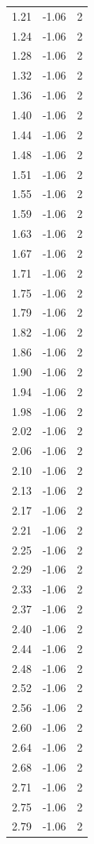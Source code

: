 \begin{longtable}{lrr}
  1.21 & -1.06 & 2 \\
  1.24 & -1.06 & 2 \\
  1.28 & -1.06 & 2 \\
  1.32 & -1.06 & 2 \\
  1.36 & -1.06 & 2 \\
  1.40 & -1.06 & 2 \\
  1.44 & -1.06 & 2 \\
  1.48 & -1.06 & 2 \\
  1.51 & -1.06 & 2 \\
  1.55 & -1.06 & 2 \\
  1.59 & -1.06 & 2 \\
  1.63 & -1.06 & 2 \\
  1.67 & -1.06 & 2 \\
  1.71 & -1.06 & 2 \\
  1.75 & -1.06 & 2 \\
  1.79 & -1.06 & 2 \\
  1.82 & -1.06 & 2 \\
  1.86 & -1.06 & 2 \\
  1.90 & -1.06 & 2 \\
  1.94 & -1.06 & 2 \\
  1.98 & -1.06 & 2 \\
  2.02 & -1.06 & 2 \\
  2.06 & -1.06 & 2 \\
  2.10 & -1.06 & 2 \\
  2.13 & -1.06 & 2 \\
  2.17 & -1.06 & 2 \\
  2.21 & -1.06 & 2 \\
  2.25 & -1.06 & 2 \\
  2.29 & -1.06 & 2 \\
  2.33 & -1.06 & 2 \\
  2.37 & -1.06 & 2 \\
  2.40 & -1.06 & 2 \\
  2.44 & -1.06 & 2 \\
  2.48 & -1.06 & 2 \\
  2.52 & -1.06 & 2 \\
  2.56 & -1.06 & 2 \\
  2.60 & -1.06 & 2 \\
  2.64 & -1.06 & 2 \\
  2.68 & -1.06 & 2 \\
  2.71 & -1.06 & 2 \\
  2.75 & -1.06 & 2 \\
  2.79 & -1.06 & 2 \\

\end{longtable}
